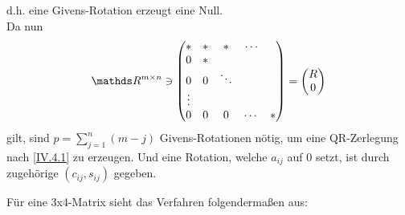 d.h. eine Givens-Rotation erzeugt eine Null.\\
Da nun
\begin{gather*}
  \R^{m\times n}\ni \begin{pmatrix}
    * & * &* & \cdots   \\
    0 & * &     \\
    0 & 0 & \ddots \\
    \vdots \\
    0 & 0 & 0 & \cdots & *		
  \end{pmatrix}
  = \begin{pmatrix} R\\0\end{pmatrix}
\end{gather*}
gilt, sind $p=\sum_{j=1}^{n}(m-j)$ Givens-Rotationen nötig,
um eine QR-Zerlegung nach \eqref{IV.4.1} zu erzeugen.
Und eine Rotation, welche $a_{ij} $ auf 0 setzt, ist durch zugehörige 
$(c_{ij}, s_{ij}) $ gegeben.

Für eine 3x4-Matrix sieht das Verfahren folgendermaßen aus:

